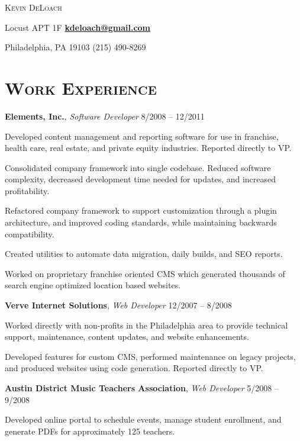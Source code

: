 \documentclass[12pt,a4paper]{article}
\newcommand{\sectionhead}{\normalfont\normalsize\scshape}
\newcommand{\li}{\item[--]}
\newcommand{\workhead}[3]{\textbf{#1}, \emph{#2} \hfill #3}
\begin{document}

\begin{center}
\textsc{\huge{Kevin DeLoach}}
\end{center}

 Locust APT 1F
\hfill
\href{mailto:kdeloach@gmail.com}{\bfseries kdeloach@gmail.com}

\noindent
Philadelphia, PA 19103
\hfill
(215) 490-8269

\section*{\sectionhead Work Experience}
\begin{description}[leftmargin=1em] \itemsep10pt \parskip0pt

    \item 
        \workhead{Elements, Inc.}{Software Developer}{8/2008 -- 12/2011}
        \begin{itemize*}
            \li Developed content management and reporting software for use in franchise, health care, real estate, and private equity industries. Reported directly to VP.
            \li Consolidated company framework into single codebase. Reduced software complexity, decreased development time needed for updates, and increased profitability.
            \li Refactored company framework to support customization through a plugin architecture, and improved coding standards, while maintaining backwards compatibility.
            \li Created utilities to automate data migration, daily builds, and SEO reports. 
            \li Worked on proprietary franchise oriented CMS which generated thousands of search engine optimized location based websites.
        \end{itemize*}

    \item 
        \workhead{Verve Internet Solutions}{Web Developer}{12/2007 -- 8/2008}
        \begin{itemize*}
            \li Worked directly with non-profits in the Philadelphia area to provide technical support, maintenance, content updates, and website enhancements.
            \li Developed features for custom CMS, performed maintenance on legacy projects, and produced websites using code generation. Reported directly to VP.
        \end{itemize*}

    \item
        \workhead{Austin District Music Teachers Association}{Web Developer}{5/2008 -- 9/2008}
        \begin{itemize*}
            \li Developed online portal to schedule events, manage student enrollment, and generate PDFs for approximately 125 teachers.
        \end{itemize*}


\end{description}
\end{document}
